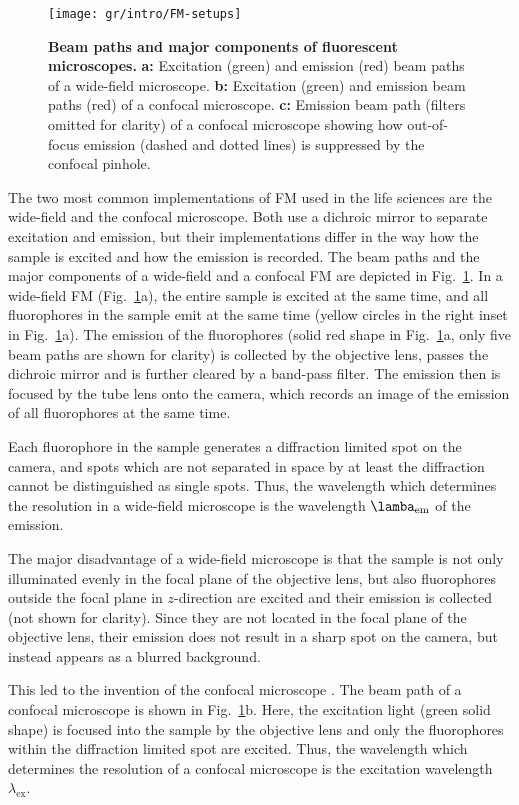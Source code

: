 \begin{figure}
  \texttt{[image: gr/intro/FM-setups]}
  \caption{\textbf{Beam paths and major components of fluorescent
      microscopes.} \textbf{a:} Excitation (green) and emission (red) beam
    paths of a wide-field microscope. \textbf{b:} Excitation (green) and
    emission beam paths (red) of a confocal microscope.  \textbf{c:} Emission
    beam path (filters omitted for clarity) of a confocal microscope showing
    how out-of-focus emission (dashed and dotted lines) is suppressed by the
    confocal pinhole.}
  \label{fig:FM-setups}
\end{figure}

The two most common implementations of FM used in the life sciences are the
wide-field and the confocal microscope. Both use a dichroic mirror to separate
excitation and emission, but their implementations differ in the way how the
sample is excited and how the emission is recorded. The beam paths and the
major components of a wide-field and a confocal FM are depicted in
Fig.~\ref{fig:FM-setups}. In a wide-field FM (Fig.~\ref{fig:FM-setups}a), the
entire sample is excited at 
the same time, and all fluorophores in the sample emit at the same time
(yellow circles in the right inset in Fig.~\ref{fig:FM-setups}a). The emission
of the fluorophores (solid red shape in Fig.~\ref{fig:FM-setups}a, only five
beam paths are shown for clarity) is collected by the objective lens, passes
the dichroic mirror and is further cleared by a band-pass filter. The emission
then is focused by the tube lens onto the camera, which records an image of
the emission of all fluorophores at the same time.

Each fluorophore in the sample generates a diffraction limited spot on the
camera, and spots which are not separated in space by at least the diffraction
cannot be distinguished as single spots. Thus, the wavelength which determines
the resolution in a wide-field microscope is the wavelength $\lamba_\text{em}$
of the emission.

The major disadvantage of a wide-field microscope is that the sample is not
only illuminated evenly in the focal plane of the objective lens, but also
fluorophores outside the focal plane in $z$-direction are excited and their
emission is collected (not shown for clarity). Since they are not located in
the focal plane of the objective lens, their emission does not result in a
sharp spot on the camera, but instead appears as a blurred background.    

This led to the invention of the confocal microscope
. The beam path of a confocal microscope is
shown in Fig.~\ref{fig:FM-setups}b. Here, the excitation light (green solid
shape) is focused into the sample by the objective lens and only the
fluorophores within the diffraction limited spot are excited. Thus, the
wavelength which determines the resolution of a confocal microscope is the
excitation wavelength $\lambda_\text{ex}$.  


